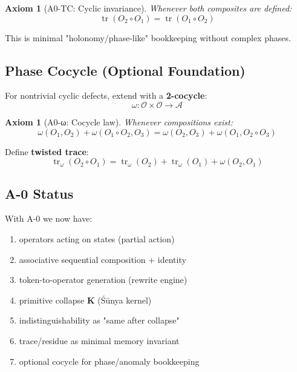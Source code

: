 \documentclass[12pt, oneside]{article}
\newtheorem{axiom}[theorem]{Axiom}
\DeclareMathOperator{\tr}{tr}
\newcommand{\K}{\mathbf{K}}
\newcommand{\A}{\mathcal{A}}
\newcommand{\Opr}{\mathcal{O}}
\begin{document}
\begin{axiom}[A0-TC: Cyclic invariance]
Whenever both composites are defined:
\begin{equation}
\tr(O_2 \circ O_1) = \tr(O_1 \circ O_2)
\end{equation}
\end{axiom}

This is minimal "holonomy/phase-like" bookkeeping without complex phases.

\subsection{Phase Cocycle (Optional Foundation)}

For nontrivial cyclic defects, extend with a \textbf{2-cocycle}:
\begin{equation}
\omega: \Opr \times \Opr \rightarrow \A
\end{equation}

\begin{axiom}[A0-ω: Cocycle law]
Whenever compositions exist:
\begin{equation}
\omega(O_1, O_2) + \omega(O_1 \circ O_2, O_3) = \omega(O_2, O_3) + \omega(O_1, O_2 \circ O_3)
\end{equation}
\end{axiom}

Define \textbf{twisted trace}:
\begin{equation}
\tr_\omega(O_2 \circ O_1) = \tr_\omega(O_2) + \tr_\omega(O_1) + \omega(O_2, O_1)
\end{equation}

\subsection{A-0 Status}

With A-0 we now have:
\begin{enumerate}
    \item operators acting on states (partial action)
    \item associative sequential composition + identity
    \item token-to-operator generation (rewrite engine)
    \item primitive collapse $\K$ (Śūnya kernel)
    \item indistinguishability as "same after collapse"
    \item trace/residue as minimal memory invariant
    \item optional cocycle for phase/anomaly bookkeeping
\end{enumerate}
\end{document}
